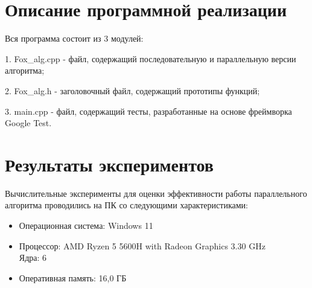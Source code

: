 \documentclass{report}
\begin{document}
\newpage

\section*{Описание программной реализации}
Вся программа состоит из 3 модулей: 
\par 1. Fox\_alg.cpp - файл, содержащий последовательную и параллельную версии алгоритма; 
\par 2. Fox\_alg.h - заголовочный файл, содержащий прототипы функций; 
\par 3. main.cpp - файл, содержащий тесты, разработанные на основе фреймворка Google Test.
\newpage

\section*{Результаты экспериментов}
Вычислительные эксперименты для оценки эффективности работы параллельного алгоритма проводились на ПК со следующими характеристиками:
\begin{itemize}
	\item Операционная система: Windows 11
	\item Процессор: 
	AMD Ryzen 5 5600H with Radeon Graphics 3.30 GHz\\
	Ядра: 6
	\item Оперативная память: 16,0 ГБ
\end{itemize}



\begin{table}[!h]
\centering
{}
\caption{Результаты экспериментов с OpenMP, 4 процесса}
\end{table}

\begin{table}[!h]
\centering
{}
\caption{Результаты экспериментов с TBB, 4 процесса}
\end{table}
\end{document}
